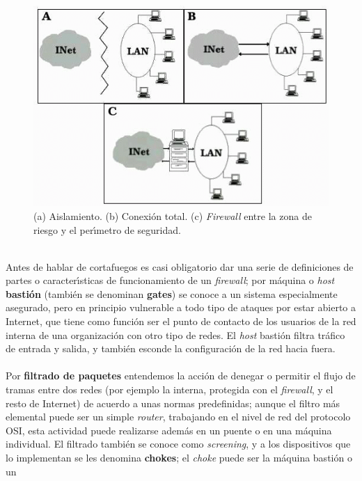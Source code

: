 \begin{figure}
\begin{center}
\includegraphics[width=\textwidth]{fw.png}
\caption{(a) Aislamiento. (b) Conexi\'on total. (c) {\it Firewall} entre la
zona de riesgo y el per\'{\i}metro de seguridad.}
\label{lanwan}
\end{center}
\end{figure}
\\Antes de hablar de cortafuegos es casi obligatorio dar una serie
de definiciones de partes o caracter\'{\i}sticas de funcionamiento de un {\it
firewall}; por m\'aquina o {\it host} {\bf basti\'on} (tambi\'en se denominan
{\bf gates}) se conoce a un sistema especialmente asegurado, pero en principio
vulnerable a todo tipo de ataques por estar abierto
a Internet, que tiene como funci\'on ser el punto de contacto de los usuarios
de la red interna de una organizaci\'on con otro tipo de redes. El {\it host}
basti\'on filtra tr\'afico de entrada y salida, y tambi\'en esconde la 
configuraci\'on de la red hacia fuera.\\
\\Por {\bf filtrado de paquetes} entendemos la acci\'on de denegar o permitir
el flujo de tramas entre dos redes (por ejemplo la interna, protegida con el
{\it firewall}, y el resto de Internet) de acuerdo a unas normas predefinidas;
aunque el filtro m\'as elemental puede ser un simple {\it router}, trabajando 
en el nivel de red del protocolo OSI, esta actividad puede realizarse 
adem\'as en un puente o en una m\'aquina individual. El filtrado tambi\'en se 
conoce como {\it screening}, y a los dispositivos que lo implementan se les
denomina {\bf chokes}; el {\it choke} puede ser la m\'aquina basti\'on o un
